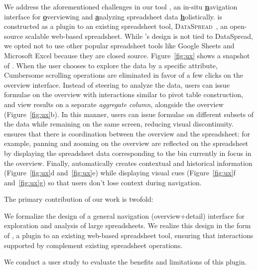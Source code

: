  We address the aforementioned challenges
in our tool \noah,
an in-situ
\textbf{\underline{n}}avigation interface
for \textbf{\underline{o}}verviewing
and \textbf{\underline{a}}nalyzing
spreadsheet data \textbf{\underline{h}}olistically.
\noah is constructed as a plugin to
an existing spreadsheet tool,
{\scshape DataSpread}~\cite{dataspread},
an open-source scalable web-based spreadsheet.
While \noah's design is not tied to {\sc DataSpread},
we opted not to use other popular spreadsheet
tools like Google Sheets and Microsoft Excel because they
are closed source.
Figure~\ref{fig:ux} shows a snapshot of \noah.
When the user chooses to explore
the data by a specific attribute,
 Cumbersome scrolling operations are eliminated in favor
of a few clicks on the overview interface. Instead of steering to analyze the data,
users can issue formulae
on the overview with interactions similar to pivot table construction,
and view results on a separate {\em aggregate column},
alongside the overview (Figure~\ref{fig:ux}b). 
In this manner,
users can issue formulae on different
subsets of the data while remaining on the same screen,
reducing visual discontinuity.
\noah ensures that there is coordination between
the overview and the spreadsheet:
for example, panning and zooming on the overview
are reflected on the spreadsheet by displaying
the spreadsheet data corresponding to the bin
currently in focus in the overview.
Finally, \noah automatically creates
contextual and historical information
(Figure~\ref{fig:ux}d and~\ref{fig:ux}e)
while displaying visual cues
(Figure~\ref{fig:ux}f and~\ref{fig:ux}g)
so that users don't lose context during navigation.

The primary contribution of our work is twofold:
\squishlist
\item We formalize the design of a general
navigation (overview+detail) interface
for exploration and analysis of large spreadsheets.
We realize this design in the form of \noah,
a plugin to an existing web-based spreadsheet tool,
ensuring that interactions supported by \noah
complement existing spreadsheet operations.
\item We conduct a user study to evaluate
the benefits and limitations of this plugin.
\squishend


